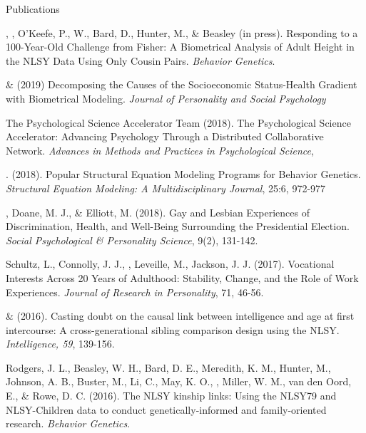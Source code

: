 \begin{rSection}{\textrm{Publications}}%
\begin{etaremune}
\item\Joe, \meb, O'Keefe, P., W., Bard, D., Hunter, M., \& Beasley (in press). Responding to a 100-Year-Old Challenge from Fisher: A Biometrical Analysis of Adult Height in the NLSY Data Using Only Cousin Pairs.  \textit{Behavior Genetics}.
\item \meb \& \joe (2019) Decomposing the Causes of the Socioeconomic Status-Health Gradient with Biometrical Modeling. \textit{Journal of Personality and Social Psychology} \href{https://osf.io/vd2kc/}{\color{blue}{https://osf.io/vd2kc/}}
\item The Psychological Science Accelerator Team (2018). The Psychological Science Accelerator: Advancing Psychology Through a Distributed Collaborative Network. \textit{Advances in Methods and Practices in Psychological Science}, \href{https://psyarxiv.com/785qu/}{\color{blue}{https://psyarxiv.com/785qu/}}
\item \meb. (2018). Popular Structural Equation Modeling Programs for Behavior Genetics. \textit{Structural Equation Modeling: A Multidisciplinary Journal}, 25:6, 972-977 \href{}{\color{blue}{doi:10.1080/10705511.2018.1493385}}
\item\meb, Doane, M. J., \& Elliott, M. (2018). Gay and Lesbian Experiences of Discrimination, Health, and Well-Being Surrounding the Presidential Election. \textit{Social Psychological \& Personality Science}, 9(2), 131-142. \href{https://dx.doi.org/10.17605/OSF.IO/DWSCM}{\color{blue}{https://osf.io/dwscm/}}
\item Schultz, L., Connolly, J. J., \meb, Leveille, M., Jackson, J. J. (2017). Vocational Interests Across 20 Years of Adulthood: Stability, Change, and the Role of Work Experiences. \textit{Journal of Research in Personality}, 71, 46-56.
\item\meb \& \Joe (2016). Casting doubt on the causal link between intelligence and age at first intercourse: A cross-generational sibling comparison design using the NLSY. \textit{Intelligence, 59}, 139-156. \href{http://www.sciencedirect.com/science/article/pii/S0160289616300162}{\color{blue}{doi:10.1016/j.intell.2016.08.008}}
\item Rodgers, J. L., Beasley, W. H., Bard, D. E., Meredith, K. M., Hunter, M., Johnson, A. B., Buster, M., Li, C., May, K. O., \meb, Miller, W. M., van den Oord, E., \& Rowe, D. C. (2016). The NLSY kinship links: Using the NLSY79 and NLSY-Children data to conduct genetically-informed and family-oriented research. \textit{Behavior Genetics}. \href{http://dx.doi.org/10.1007/s10519-016-9785-3}{\color{blue}{doi:10.1007/s10519-016-9785-3}}

\end{etaremune}
\end{rSection}
